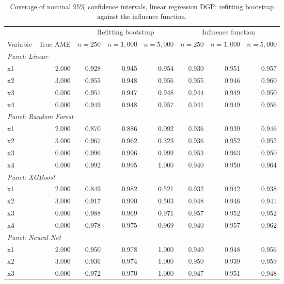 \begin{table}[htbp]
\centering
\small
\begin{threeparttable}
\caption{Coverage of nominal 95\% confidence intervals, linear regression DGP: refitting bootstrap against the influence function.}
\label{tab:sim3_coverage_regression_linear}
\begin{tabular}{lrrrrrrr}
\toprule
 & & \multicolumn{3}{c}{Refitting bootstrap} & \multicolumn{3}{c}{Influence function} \\
\cmidrule(lr){3-5} \cmidrule(lr){6-8}
Variable & True AME & $n=250$ & $n=1,000$ & $n=5,000$ & $n=250$ & $n=1,000$ & $n=5,000$ \\
\midrule
\multicolumn{8}{l}{\textit{Panel: Linear}} \\
\quad x1 & 2.000 & 0.928 & 0.945 & 0.954 & 0.930 & 0.951 & 0.957 \\
\quad x2 & 3.000 & 0.955 & 0.948 & 0.956 & 0.955 & 0.946 & 0.960 \\
\quad x3 & 0.000 & 0.951 & 0.947 & 0.948 & 0.944 & 0.949 & 0.950 \\
\quad x4 & 0.000 & 0.949 & 0.948 & 0.957 & 0.941 & 0.949 & 0.956 \\
\midrule
\multicolumn{8}{l}{\textit{Panel: Random Forest}} \\
\quad x1 & 2.000 & 0.870 & 0.886 & 0.092 & 0.936 & 0.939 & 0.946 \\
\quad x2 & 3.000 & 0.967 & 0.962 & 0.323 & 0.936 & 0.952 & 0.952 \\
\quad x3 & 0.000 & 0.996 & 0.996 & 0.999 & 0.953 & 0.963 & 0.950 \\
\quad x4 & 0.000 & 0.992 & 0.995 & 1.000 & 0.940 & 0.950 & 0.964 \\
\midrule
\multicolumn{8}{l}{\textit{Panel: XGBoost}} \\
\quad x1 & 2.000 & 0.849 & 0.982 & 0.521 & 0.932 & 0.942 & 0.938 \\
\quad x2 & 3.000 & 0.917 & 0.990 & 0.503 & 0.948 & 0.946 & 0.941 \\
\quad x3 & 0.000 & 0.988 & 0.969 & 0.971 & 0.957 & 0.952 & 0.952 \\
\quad x4 & 0.000 & 0.978 & 0.975 & 0.969 & 0.940 & 0.957 & 0.962 \\
\midrule
\multicolumn{8}{l}{\textit{Panel: Neural Net}} \\
\quad x1 & 2.000 & 0.950 & 0.978 & 1.000 & 0.940 & 0.948 & 0.956 \\
\quad x2 & 3.000 & 0.936 & 0.974 & 1.000 & 0.950 & 0.939 & 0.959 \\
\quad x3 & 0.000 & 0.972 & 0.970 & 1.000 & 0.947 & 0.951 & 0.948 \\

\end{tabular}
\end{threeparttable}
\end{table}
